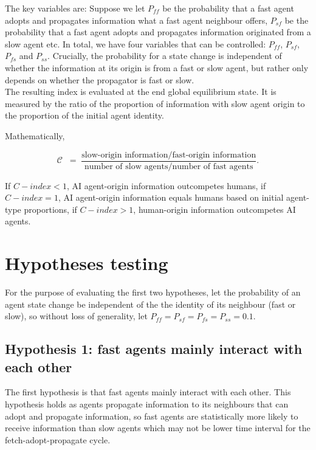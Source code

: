 \documentclass{article}
\newcommand{\Cidx}{\mathcal{C}}      %
\begin{document}
The key variables are: Suppose we let $P_{ff}$ be the probability that a fast agent adopts and propagates information what a fast agent neighbour offers, $P_{sf}$ be the probability that a fast agent adopts and propagates information originated from a slow agent etc. In total, we have four variables that can be controlled: $P_{ff}$, $P_{sf}$, $P_{fs}$ and $P_{ss}$. Crucially, the probability for a state change is independent of whether the information at its origin is from a fast or slow agent, but rather only depends on whether the propagator is fast or slow.\\

The resulting index is evaluated at the end global equilibrium state. It is measured by the ratio of the proportion of information with slow agent origin to the proportion of the initial agent identity.

Mathematically, 



\[
\Cidx \;
       \;=\; \frac{\text{slow-origin information} / \text{fast-origin information}}{\text{number of slow agents} / \text{number of fast agents}}.
\]

If $C-index < 1$, AI agent-origin information outcompetes humans, if $C-index = 1$, AI agent-origin information equals humans based on initial agent-type proportions, if $C-index > 1$, human-origin information outcompetes AI agents.

\section{Hypotheses testing}

For the purpose of evaluating the first two hypotheses, let the probability of an agent state change be independent of the the identity of its neighbour (fast or slow), so without loss of generality, let $P_{ff} = P_{sf} = P_{fs} = P_{ss} = 0.1$. \\

\subsection{Hypothesis 1: fast agents mainly interact with each other}

The first hypothesis is that fast agents mainly interact with each other. This hypothesis holds as agents propagate information to its  neighbours that can adopt and propagate information, so fast agents are statistically more likely to receive information than slow agents which may not be lower time interval for the fetch-adopt-propagate cycle. \\
\end{document}
